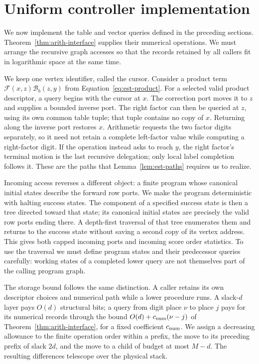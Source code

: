\section{Uniform controller implementation}\label{sec:ctrl}

We now implement the table and vector queries defined in the preceding
sections.  Theorem~\ref{thm:arith-interface} supplies their numerical
operations.  We must arrange the recursive graph accesses so that the
records retained by all callers fit in logarithmic space at the same
time.

We keep one vertex identifier, called the cursor.  Consider a product term
$\mathcal F(x,z)\mathcal B_b(z,y)$ from
Equation~\eqref{eq:est-product}.  For a selected valid product descriptor, a query begins with the cursor
at $x$.
The correction port moves it to $z$ and supplies a bounded inverse port.
The right factor can then be queried at $z$, using its own common table
tuple; that tuple contains no copy of $x$.  Returning along the inverse
port restores $x$.  Arithmetic requests the two factor digits separately,
so it need not retain a complete left-factor value while computing a
right-factor digit.  If the operation instead asks to reach $y$, the
right factor's terminal motion is the last recursive delegation; only
local label completion follows it.  These are the paths that
Lemma~\ref{lem:est-paths} requires us to realize.

Incoming access reverses a different object: a finite program whose
canonical initial states describe the forward row ports.  We make the
program deterministic with halting success states.  The component of a
specified success state is then a tree directed toward that state; its
canonical initial states are precisely the valid row ports ending there.  A depth-first traversal of that tree enumerates them and returns to
the success state without saving a second copy of its vertex address.  This gives both
capped incoming ports and incoming score order statistics.  To use the traversal we
must define program states and their predecessor queries carefully:
working states of a completed lower query are not themselves part of
the calling program graph.

The storage bound follows the same distinction.  A caller retains its
own descriptor choices and numerical path while a lower procedure runs.
A slack-$d$ layer pays $O(d)$ structural bits; a query from digit place
$\nu$ to place $j$ pays for its numerical records through the bound
$O(d)+c_{\rm num}(\nu-j)$ of Theorem~\ref{thm:arith-interface}, for a
fixed coefficient $c_{\rm num}$.  We assign a decreasing
allowance to the finite operation order within a prefix, the move to its
preceding prefix of slack $2d$, and the move to a child of budget at most
$M-d$.  The resulting differences telescope over the physical stack.

